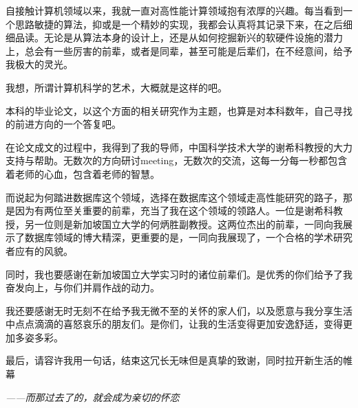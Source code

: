 \begin{acknowledgements}

自接触计算机领域以来，我就一直对高性能计算领域抱有浓厚的兴趣。每当看到一个思路敏捷的算法，抑或是一个精妙的实现，我都会认真将其记录下来，在之后细细品读。无论是从算法本身的设计上，还是从如何挖掘新兴的软硬件设施的潜力上，总会有一些厉害的前辈，或者是同辈，甚至可能是后辈们，在不经意间，给予我极大的灵光。

我想，所谓计算机科学的艺术，大概就是这样的吧。

本科的毕业论文，以这个方面的相关研究作为主题，也算是对本科数年，自己寻找的前进方向的一个答复吧。

在论文成文的过程中，我得到了我的导师，中国科学技术大学的谢希科教授的大力支持与帮助。无数次的方向研讨meeting，无数次的交流，这每一分每一秒都包含着老师的心血，包含着老师的智慧。

而说起为何踏进数据库这个领域，选择在数据库这个领域走高性能研究的路子，那是因为有两位至关重要的前辈，充当了我在这个领域的领路人。一位是谢希科教授，另一位则是新加坡国立大学的何炳胜副教授。这两位杰出的前辈，一同向我展示了数据库领域的博大精深，更重要的是，一同向我展现了，一个合格的学术研究者应有的风貌。

同时，我也要感谢在新加坡国立大学实习时的诸位前辈们。是优秀的你们给予了我奋发向上，与你们并肩作战的动力。

我还要感谢无时无刻不在给予我无微不至的关怀的家人们，以及愿意与我分享生活中点点滴滴的喜怒哀乐的朋友们。是你们，让我的生活变得更加安逸舒适，变得更加多姿多彩。

最后，请容许我用一句话，结束这冗长无味但是真挚的致谢，同时拉开新生活的帷幕

\emph{——而那过去了的，就会成为亲切的怀恋}

\end{acknowledgements}
